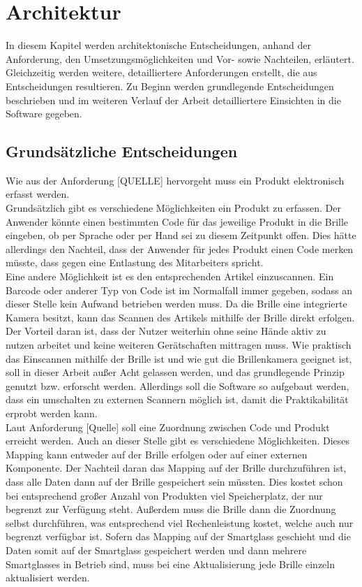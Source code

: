 \chapter{Architektur}
\label{cha:architektur}
In diesem Kapitel werden architektonische Entscheidungen, anhand der Anforderung, den Umsetzungsmöglichkeiten und Vor- sowie Nachteilen, erläutert. Gleichzeitig werden weitere, detailliertere Anforderungen erstellt, die aus Entscheidungen resultieren. Zu Beginn werden grundlegende Entscheidungen beschrieben und im weiteren Verlauf der Arbeit detailliertere Einsichten in die Software gegeben.
\section{Grundsätzliche Entscheidungen}
\label{sec:grund_entscheidungen}
Wie aus der Anforderung [QUELLE] hervorgeht muss ein Produkt elektronisch erfasst werden.
\\
Grundsätzlich gibt es verschiedene Möglichkeiten ein Produkt zu erfassen. 
Der Anwender könnte einen bestimmten Code für das jeweilige Produkt in die Brille eingeben, ob per Sprache oder per Hand sei zu diesem Zeitpunkt offen. Dies hätte allerdings den Nachteil, dass der Anwender für jedes Produkt einen Code merken müsste, dass gegen eine Entlastung des Mitarbeiters spricht.
\\
Eine andere Möglichkeit ist es den entsprechenden Artikel einzuscannen. Ein Barcode oder anderer Typ von Code ist im Normalfall immer gegeben, sodass an dieser Stelle kein Aufwand betrieben werden muss. Da die Brille eine integrierte Kamera besitzt, kann das Scannen des Artikels mithilfe der Brille direkt erfolgen. Der Vorteil daran ist, dass der Nutzer weiterhin ohne seine Hände aktiv zu nutzen arbeitet und keine weiteren Gerätschaften mittragen muss. Wie praktisch das Einscannen mithilfe der Brille ist und wie gut die Brillenkamera geeignet ist, soll in dieser Arbeit außer Acht gelassen werden, und das grundlegende Prinzip genutzt bzw. erforscht werden. 
Allerdings soll die Software so aufgebaut werden, dass ein umschalten zu externen Scannern möglich ist, damit die Praktikabilität erprobt werden kann.
\\
Laut Anforderung [Quelle] soll eine Zuordnung zwischen Code und Produkt erreicht werden.
Auch an dieser Stelle gibt es verschiedene Möglichkeiten. 
Dieses Mapping kann entweder auf der Brille erfolgen oder auf einer externen Komponente. Der Nachteil daran das Mapping auf der Brille durchzuführen ist, dass alle Daten dann auf der Brille gespeichert sein müssten. Dies kostet schon bei entsprechend großer Anzahl von Produkten viel Speicherplatz, der nur begrenzt zur Verfügung steht. Außerdem muss die Brille dann die Zuordnung selbst durchführen, was entsprechend viel Rechenleistung kostet, welche auch nur begrenzt verfügbar ist. Sofern das Mapping auf der Smartglass geschieht und die Daten somit auf der Smartglass gespeichert werden und dann mehrere Smartglasses in Betrieb sind, muss bei eine Aktualisierung jede Brille einzeln aktualisiert werden. 
